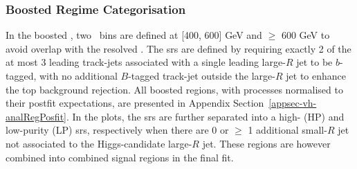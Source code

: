 \subsubsection{Boosted Regime Categorisation}
In the boosted \vhb, two \ptv\ bins are defined at [400, 600] GeV and $\geq$ 600 GeV to avoid overlap with the resolved \vhb. The \glspl{sr} are defined by requiring exactly 2 of the at most 3 leading track-jets associated with a single leading large-$R$ jet to be $b$-tagged, with no additional $B$-tagged track-jet outside the large-$R$ jet to enhance the top background rejection. All boosted regions, with processes normalised to their postfit expectations, are presented in Appendix Section~\ref{appsec-vh-analRegPosfit}. In the plots, the \glspl{sr} are further separated into a high- (HP) and low-purity (LP) \glspl{sr}, respectively when there are 0 or $\geq$ 1 additional small-$R$ jet not associated to the Higgs-candidate large-$R$ jet. These regions are however combined into combined signal regions in the final fit.

